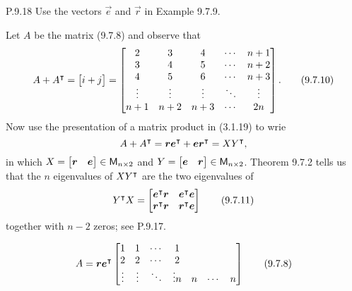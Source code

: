 \documentclass{../homework}
\begin{document}
\begin{problems}
\begin{enumerate}
\begin{solution}
    \end{solution}
  \end{enumerate}
\item[P.9.18] Use the vectors \(\vec e\) and \(\vec r\) in Example
  9.7.9.
  \begin{bookexample}[9.7.9]
    Let \(A\) be the matrix (9.7.8) and observe that
    \[
      A + A^\intercal = \begin{bmatrix} i+j \end{bmatrix}
      =
      \begin{bmatrix}
        2 & 3 & 4 & \cdots & n+1 \\
        3 & 4 & 5 & \cdots & n+2 \\
        4 & 5 & 6 & \cdots & n+3 \\
        \vdots & \vdots & \vdots & \ddots & \vdots \\
        n+1 & n+2 & n+3 & \cdots & 2n
      \end{bmatrix}.
      \tag{9.7.10}
    \]
    Now use the presentation of a matrix product in (3.1.19) to wrie
    \[
      A + A^\transpose = \vec r \vec e^\transpose
      + \vec e \vec r^\transpose = XY^\transpose,
    \]
    in which
    \(X = \begin{bmatrix} \vec r & \vec e \end{bmatrix} \in \M_{n
      \times 2}\) and
    \(Y = \begin{bmatrix} \vec e & \vec r \end{bmatrix} \in \M_{n
      \times 2}\).  Theorem 9.7.2 tells us that the \(n\) eigenvalues
    of \(XY^\intercal\) are the two eigenvalues of
    \[
      Y^\transpose X =
      \begin{bmatrix}
        \vec e^\transpose \vec r & \vec e^\transpose \vec e \\
        \vec r^\transpose \vec r & \vec r^\transpose \vec e \\
      \end{bmatrix}
      \tag{9.7.11}
    \]
    together with \(n-2\) zeros; see P.9.17.
  \end{bookexample}

  \begin{book}
    \[
      A = \vec r \vec e^\transpose
      \begin{bmatrix}
        1 & 1 & \cdots & 1 \\
        2 & 2 & \cdots & 2 \\
        \vdots & \vdots & \ddots & \vdots
        n & n & \cdots & n \\
      \end{bmatrix}
      \tag{9.7.8}
    \]
  \end{book}


\end{problems}
\end{document}
